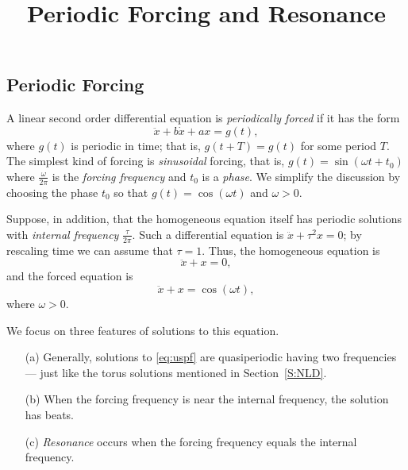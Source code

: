 \documentclass{ximera}
\title{Periodic Forcing and Resonance}
\begin{document}
\begin{abstract}
\end{abstract}
\maketitle


\label{S:resonance}

\subsection*{Periodic Forcing}

A linear second order differential equation is {\em periodically forced\/} 
 if it has the form
\[
\ddot{x} + b\dot{x} + ax = g(t),
\]
where $g(t)$ is periodic in time; that is, $g(t+T) = g(t)$ for some
period $T$.  The simplest kind of forcing is {\em sinusoidal\/} forcing,
that is, $g(t)=\sin(\omega t+ t_0)$ where $\frac{\omega}{2\pi}$ is the 
{\em forcing frequency\/} and $t_0$ is a 
{\em phase\/}.  We simplify 
the discussion by choosing the phase $t_0$ so that $g(t)=\cos(\omega t)$ 
and $\omega>0$.

Suppose, in addition, that the homogeneous equation itself has periodic 
solutions with 
{\em internal frequency\/} 
$\frac{\tau}{2\pi}$.  Such a 
differential equation is $\ddot{x}+\tau^2x=0$; by rescaling time we 
can assume that $\tau=1$.   Thus, the homogeneous equation is 
\[
\ddot x + x = 0,
\]
and the forced equation is
\begin{equation} \label{eq:uspf}
\ddot x + x = \cos(\omega t),
\end{equation}
where $\omega>0$.

We focus on three features of solutions to this equation.
\begin{itemize}
\item[(a)]	Generally, solutions to \eqref{eq:uspf} are quasiperiodic 
having two frequencies --- just like the torus 
solutions mentioned in Section~\ref{S:NLD}.
\item[(b)]	When the forcing frequency is near the internal frequency, the
solution has beats.
\item[(c)] 	{\em Resonance\/} occurs when the 
forcing frequency equals the internal frequency.  
\end{itemize}
\end{document}
